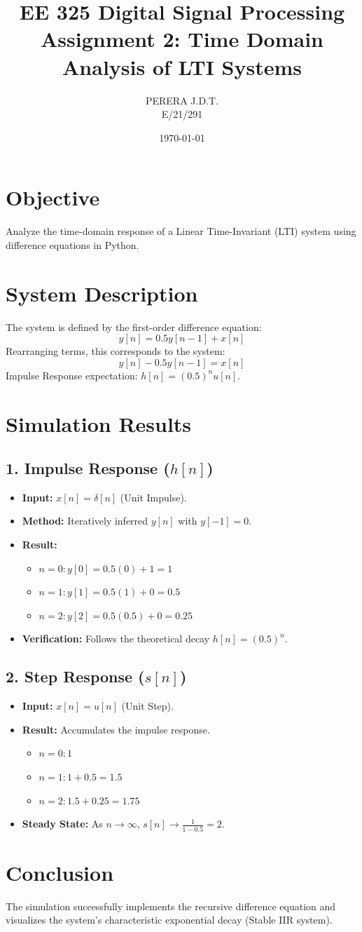 \documentclass[11pt, a4paper]{article}
\title{EE 325 Digital Signal Processing \\ Assignment 2: Time Domain Analysis of LTI Systems}
\author{PERERA J.D.T. \\ E/21/291}
\date{\today}
\begin{document}
\maketitle

\section{Objective}
Analyze the time-domain response of a Linear Time-Invariant (LTI) system using difference equations in Python.

\section{System Description}
The system is defined by the first-order difference equation:
$$y[n] = 0.5 y[n-1] + x[n]$$
Rearranging terms, this corresponds to the system:
$$y[n] - 0.5 y[n-1] = x[n]$$
Impulse Response expectation: $h[n] = (0.5)^n u[n]$.

\section{Simulation Results}
\subsection{1. Impulse Response ($h[n]$)}
\begin{itemize}
    \item \textbf{Input:} $x[n] = \delta[n]$ (Unit Impulse).
    \item \textbf{Method:} Iteratively inferred $y[n]$ with $y[-1]=0$.
    \item \textbf{Result:}
    \begin{itemize}
        \item $n=0: y[0] = 0.5(0) + 1 = 1$
        \item $n=1: y[1] = 0.5(1) + 0 = 0.5$
        \item $n=2: y[2] = 0.5(0.5) + 0 = 0.25$
    \end{itemize}
    \item \textbf{Verification:} Follows the theoretical decay $h[n] = (0.5)^n$.
\end{itemize}

\subsection{2. Step Response ($s[n]$)}
\begin{itemize}
    \item \textbf{Input:} $x[n] = u[n]$ (Unit Step).
    \item \textbf{Result:} Accumulates the impulse response.
    \begin{itemize}
        \item $n=0: 1$
        \item $n=1: 1 + 0.5 = 1.5$
        \item $n=2: 1.5 + 0.25 = 1.75$
    \end{itemize}
    \item \textbf{Steady State:} As $n \to \infty$, $s[n] \to \frac{1}{1 - 0.5} = 2$.
\end{itemize}

\section{Conclusion}
The simulation successfully implements the recursive difference equation and visualizes the system's characteristic exponential decay (Stable IIR system).
\end{document}
